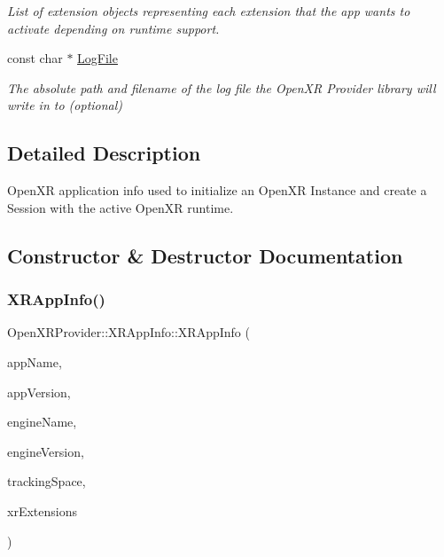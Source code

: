 \begin{DoxyCompactItemize}
\begin{DoxyCompactList}\small\item\em List of extension objects representing each extension that the app wants to activate depending on runtime support. \end{DoxyCompactList}\item 
const char $\ast$ \mbox{\hyperlink{struct_open_x_r_provider_1_1_x_r_app_info_a134d71f0d127123dc1b4b1682102b0ee}{Log\+File}}
\begin{DoxyCompactList}\small\item\em The absolute path and filename of the log file the Open\+XR Provider library will write in to (optional) \end{DoxyCompactList}\end{DoxyCompactItemize}


\subsection{Detailed Description}
Open\+XR application info used to initialize an Open\+XR Instance and create a Session with the active Open\+XR runtime. 

\subsection{Constructor \& Destructor Documentation}
\mbox{\label{struct_open_x_r_provider_1_1_x_r_app_info_aadc36b8e45d7bc4c37978f087d9a8dc6}} 
\subsubsection{\texorpdfstring{XRAppInfo()}{XRAppInfo()}}
{\footnotesize\ttfamily Open\+X\+R\+Provider\+::\+X\+R\+App\+Info\+::\+X\+R\+App\+Info (\begin{DoxyParamCaption}\item[{std\+::string}]{app\+Name,  }\item[{uint32\+\_\+t}]{app\+Version,  }\item[{std\+::string}]{engine\+Name,  }\item[{uint32\+\_\+t}]{engine\+Version,  }\item[{\mbox{\hyperlink{namespace_open_x_r_provider_a005dd91723b05b123b8fccbc41798b05}{E\+X\+R\+Tracking\+Space}}}]{tracking\+Space,  }\item[{std\+::vector$<$ void $\ast$ $>$}]{xr\+Extensions }\end{DoxyParamCaption})\hspace{0.3cm}{\ttfamily [inline]}}

